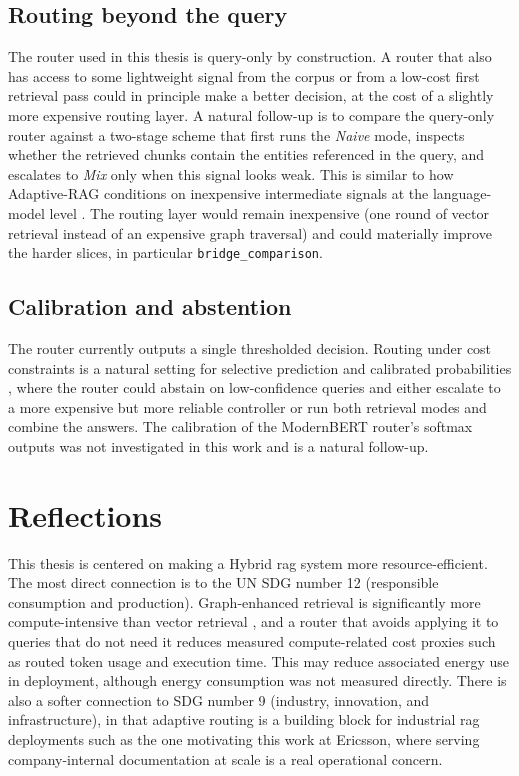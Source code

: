 \documentclass[english, bibtex]{kththesis}               %
\numberwithin{listing}{chapter}
\begin{document}
\subsection{Routing beyond the query}
\label{sec:limitRouting}

The router used in this thesis is query-only by construction. A router that also has access to some lightweight signal from the corpus or from a low-cost first retrieval pass could in principle make a better decision, at the cost of a slightly more expensive routing layer. A natural follow-up is to compare the query-only router against a two-stage scheme that first runs the \emph{Naive} mode, inspects whether the retrieved chunks contain the entities referenced in the query, and escalates to \emph{Mix} only when this signal looks weak. This is similar to how Adaptive-RAG conditions on inexpensive intermediate signals at the language-model level \cite{jeong2024adaptiverag}. The routing layer would remain inexpensive (one round of vector retrieval instead of an expensive graph traversal) and could materially improve the harder slices, in particular \texttt{bridge\_comparison}.

\subsection{Calibration and abstention}
\label{sec:limitCalibration}

The router currently outputs a single thresholded decision. Routing under cost constraints is a natural setting for selective prediction \cite{geifman2017selective} and calibrated probabilities \cite{guo2017calibration}, where the router could abstain on low-confidence queries and either escalate to a more expensive but more reliable controller or run both retrieval modes and combine the answers. The calibration of the ModernBERT router's softmax outputs was not investigated in this work and is a natural follow-up.

\section{Reflections}
\label{sec:reflections}

This thesis is centered on making a Hybrid \gls{rag} system more resource-efficient. The most direct connection is to the \gls{UN} \gls{SDG} number 12 (responsible consumption and production). Graph-enhanced retrieval is significantly more compute-intensive than vector retrieval \cite{lightrag2024,microsoft2024graphragcosts}, and a router that avoids applying it to queries that do not need it reduces measured compute-related cost proxies such as routed token usage and execution time. This may reduce associated energy use in deployment, although energy consumption was not measured directly. There is also a softer connection to \gls{SDG} number 9 (industry, innovation, and infrastructure), in that adaptive routing is a building block for industrial \gls{rag} deployments such as the one motivating this work at Ericsson, where serving company-internal documentation at scale is a real operational concern.
\end{document}

